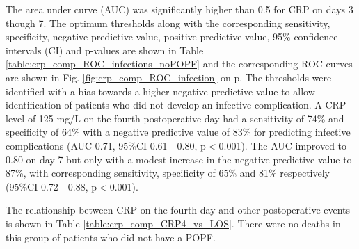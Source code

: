 The area under curve (AUC) was significantly higher than 0.5 for CRP on days 3 though 7. 
The optimum thresholds along with the corresponding sensitivity, specificity, negative predictive value, positive predictive value, 95\% confidence intervals (CI) and p-values are shown in Table \ref{table:crp_comp_ROC_infections_noPOPF} and the corresponding ROC curves are shown in Fig. \ref{fig:crp_comp_ROC_infection} on p\pageref{fig:crp_comp_ROC_infection}. 
The thresholds were identified with a bias towards a higher negative predictive value to allow identification of patients who did not develop an infective complication. 
A CRP level of 125 mg/L on the fourth postoperative day had a sensitivity of 74\% and specificity of 64\% with a negative predictive value of 83\% for predicting infective complications (AUC 0.71, 95\%CI 0.61 - 0.80, p$<$0.001). 
The AUC improved to 0.80 on day 7 but only with a modest increase in the negative predictive value to 87\%, with corresponding sensitivity, specificity of 65\% and 81\% respectively (95\%CI 0.72 - 0.88, p$<$0.001).

The relationship between CRP on the fourth day and other postoperative events is shown in Table \ref{table:crp_comp_CRP4_vs_LOS}. 
There were no deaths in this group of patients who did not have a POPF. 


